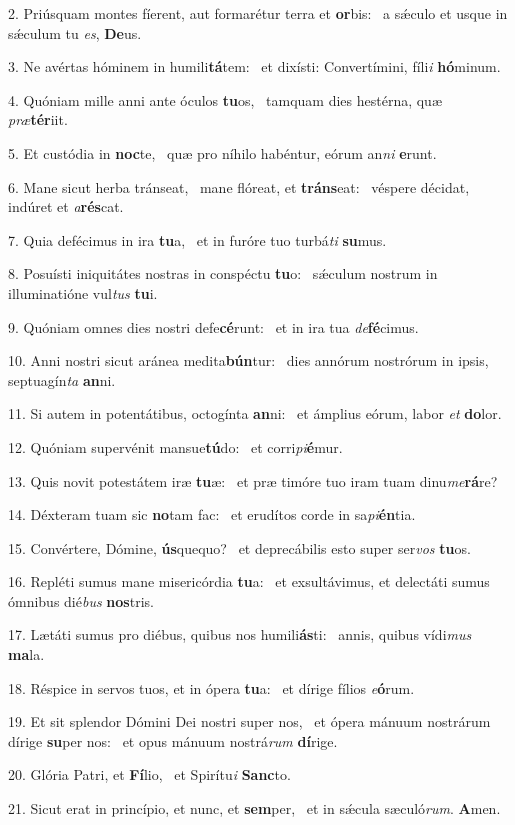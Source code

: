 2. Priúsquam montes fíerent, aut formarétur terra et \textbf{or}bis: \ast\  a sǽculo et usque in sǽculum tu \textit{es}, \textbf{De}us.\

3. Ne avértas hóminem in humili\textbf{tá}tem: \ast\  et dixísti: Convertímini, fíli\textit{i} \textbf{hó}minum.\

4. Quóniam mille anni ante óculos \textbf{tu}os, \ast\  tamquam dies hestérna, quæ \textit{præ}\textbf{tér}iit.\

5. Et custódia in \textbf{noc}te, \ast\  quæ pro níhilo habéntur, eórum an\textit{ni} \textbf{e}runt.\

6. Mane sicut herba tránseat, \dag\  mane flóreat, et \textbf{tráns}eat: \ast\  véspere décidat, indúret et \textit{a}\textbf{rés}cat.\

7. Quia defécimus in ira \textbf{tu}a, \ast\  et in furóre tuo turbá\textit{ti} \textbf{su}mus.\

8. Posuísti iniquitátes nostras in conspéctu \textbf{tu}o: \ast\  sǽculum nostrum in illuminatióne vul\textit{tus} \textbf{tu}i.\

9. Quóniam omnes dies nostri defe\textbf{cé}runt: \ast\  et in ira tua \textit{de}\textbf{fé}cimus.\

10. Anni nostri sicut aránea medita\textbf{bún}tur: \ast\  dies annórum nostrórum in ipsis, septuagín\textit{ta} \textbf{an}ni.\

11. Si autem in potentátibus, octogínta \textbf{an}ni: \ast\  et ámplius eórum, labor \textit{et} \textbf{do}lor.\

12. Quóniam supervénit mansue\textbf{tú}do: \ast\  et corri\textit{pi}\textbf{é}mur.\

13. Quis novit potestátem iræ \textbf{tu}æ: \ast\  et præ timóre tuo iram tuam dinu\textit{me}\textbf{rá}re?\

14. Déxteram tuam sic \textbf{no}tam fac: \ast\  et erudítos corde in sa\textit{pi}\textbf{én}tia.\

15. Convértere, Dómine, \textbf{ús}quequo? \ast\  et deprecábilis esto super ser\textit{vos} \textbf{tu}os.\

16. Repléti sumus mane misericórdia \textbf{tu}a: \ast\  et exsultávimus, et delectáti sumus ómnibus dié\textit{bus} \textbf{nos}tris.\

17. Lætáti sumus pro diébus, quibus nos humili\textbf{ás}ti: \ast\  annis, quibus vídi\textit{mus} \textbf{ma}la.\

18. Réspice in servos tuos, et in ópera \textbf{tu}a: \ast\  et dírige fílios \textit{e}\textbf{ó}rum.\

19. Et sit splendor Dómini Dei nostri super nos, \dag\  et ópera mánuum nostrárum dírige \textbf{su}per nos: \ast\  et opus mánuum nostrá\textit{rum} \textbf{dí}rige.\

20. Glória Patri, et \textbf{Fí}lio, \ast\  et Spirítu\textit{i} \textbf{Sanc}to.\

21. Sicut erat in princípio, et nunc, et \textbf{sem}per, \ast\  et in sǽcula sæculó\textit{rum}. \textbf{A}men.\

